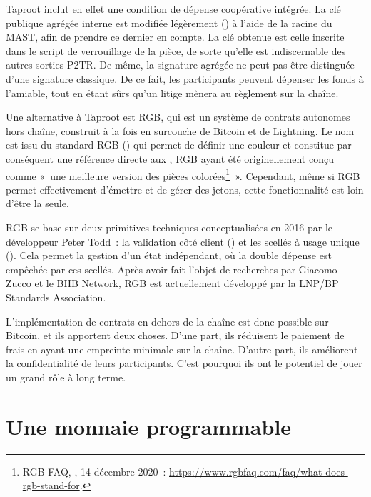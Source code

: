 Taproot inclut en effet une condition de dépense coopérative intégrée. La clé publique agrégée interne est modifiée légèrement () à l'aide de la racine du MAST, afin de prendre ce dernier en compte. La clé obtenue est celle inscrite dans le script de verrouillage de la pièce, de sorte qu'elle est indiscernable des autres sorties P2TR. De même, la signature agrégée ne peut pas être distinguée d'une signature classique. De ce fait, les participants peuvent dépenser les fonds à l'amiable, tout en étant sûrs qu'un litige mènera au règlement sur la chaîne. %

Une alternative à Taproot est RGB, qui est un système de contrats autonomes hors chaîne, construit à la fois en surcouche de Bitcoin et de Lightning. Le nom est issu du standard RGB () qui permet de définir une couleur et constitue par conséquent une référence directe aux , RGB ayant été originellement conçu comme «~une meilleure version des pièces colorées\footnote{RGB FAQ, , 14 décembre 2020~: \url{https://www.rgbfaq.com/faq/what-does-rgb-stand-for}.}~». Cependant, même si RGB permet effectivement d'émettre et de gérer des jetons, cette fonctionnalité est loin d'être la seule.

RGB se base sur deux primitives techniques conceptualisées en 2016 par le développeur Peter Todd~: la validation côté client () et les scellés à usage unique (). Cela permet la gestion d'un état indépendant, où la double dépense est empêchée par ces scellés. Après avoir fait l'objet de recherches par Giacomo Zucco et le BHB Network, RGB est actuellement développé par la LNP/BP Standards Association.

L'implémentation de contrats en dehors de la chaîne est donc possible sur Bitcoin, et ils apportent deux choses. D'une part, ils réduisent le paiement de frais en ayant une empreinte minimale sur la chaîne. D'autre part, ils améliorent la confidentialité de leurs participants. C'est pourquoi ils ont le potentiel de jouer un grand rôle à long terme.

\section*{Une monnaie programmable}

